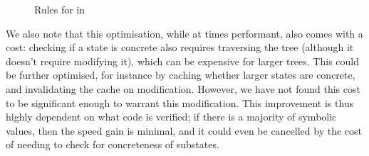 \begin{figure}
	\centering
{}
\caption{Rules for  in \SplitPMap}
\label{fig:splitpmap-set-rules}
\end{figure}

We also note that this optimisation, while at times performant, also comes with a cost: checking if a state is concrete also requires traversing the tree (although it doesn't require modifying it), which can be expensive for larger trees. This could be further optimised, for instance by caching whether larger states are concrete, and invalidating the cache on modification. However, we have not found this cost to be significant enough to warrant this modification. This improvement is thus highly dependent on what code is verified; if there is a majority of symbolic values, then the speed gain is minimal, and it could even be cancelled by the cost of needing to check for concreteness of substates.

